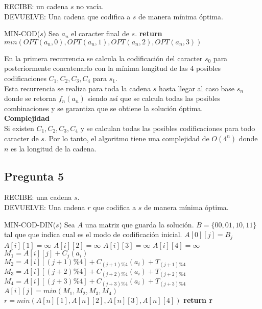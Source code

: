 \documentclass{article}
\begin{document}
\vspace{1cm}

\noindent RECIBE: un cadena $s$ no vacía.\\
DEVUELVE: Una cadena que codifica a $s$ de manera mínima óptima.
\begin{algorithmic}[1]
\item[]{MIN-COD($s$)}
\State Sea $a_n$ el caracter final de $s$.  
\State \textbf{return} $min(OPT(a_n,0), OPT(a_n,1), OPT(a_n,2), OPT(a_n,3))$  
\end{algorithmic}

En la primera recurrencia se calcula la codificación del caracter $s_0$ para posteriormente concatenarlo
con la mínima longitud de las 4 posibles codificaciones $C_1,C_2,C_3,C_4$ para $s_1$.\\
Esta recurrencia se realiza para toda la cadena $s$ hasta llegar al caso base $s_n$ donde se retorna $f_n(a_n)$
siendo así que se calcula todas las posibles combinaciones y se garantiza que se obtiene la solución óptima.\\

\textbf{Complejidad}\\
Si existen $C_1,C_2,C_3,C_4$ y se calculan todas las posibles codificaciones para todo caracter de $s$.
Por lo tanto, el algoritmo tiene una complejidad de $O(4^n)$ donde $n$ es la longitud de la cadena.



\subsection{Pregunta 5}
\noindent RECIBE: una cadena $s$.\\
DEVUELVE: Una cadena $r$ que codifica a $s$ de manera mínima óptima.

\begin{algorithmic}[1]
\item[]{MIN-COD-DIN($s$)}
\State Sea $A$ una matriz que guarda la solución.
\State $B=\{00, 01, 10, 11\}$ tal que que indica cual es el modo de codificación inicial.
    \State $A[0][j] = B_j$
\EndFor
{}
    \State $A[i][1] = \infty$
    \State $A[i][2] = \infty$
    \State $A[i][3] = \infty$
    \State $A[i][4] = \infty$
        \State $M_1 = A[i][j] + C_j(a_i)$
        \State $M_2 = A[i][(j+1)\%4] + C_{(j+1)\%4}(a_i) + T_{(j+1)\%4}$
        \State $M_3 = A[i][(j+2)\%4] + C_{(j+2)\%4}(a_i) + T_{(j+2)\%4}$
        \State $M_4 = A[i][(j+3)\%4] + C_{(j+3)\%4}(a_i) + T_{(j+3)\%4}$
        \State $A[i][j] = min(M_1, M_2, M_3, M_4)$
        \State
    \EndFor
\EndFor
\State $r = min(A[n][1], A[n][2], A[n][3], A[n][4])$
\State \textbf{return r}  
\end{algorithmic}
\end{document}
